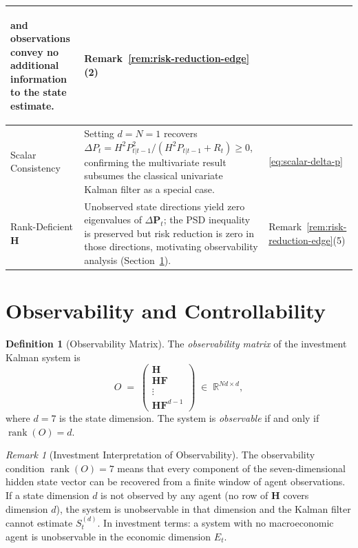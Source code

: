 \documentclass[12pt,openany]{book}
\newcommand{\calE}{\mathcal{E}}
\numberwithin{equation}{chapter}
\theoremstyle{plain}
\theoremstyle{definition}
\newtheorem{definition}[theorem]{Definition}
\theoremstyle{remark}
\newtheorem{remark}[theorem]{Remark}
\DeclareMathOperator{\rank}{rank}
\def\mathcal#1{#1}%
\begin{document}
\begin{center}
\begin{tabularx}{\linewidth}{|>{\bfseries\raggedright\arraybackslash}p{3.2cm}
                              |>{\raggedright\arraybackslash}X
                              |>{\centering\arraybackslash}p{2.8cm}|}
  and observations convey no additional information to the state
  estimate. &
  Remark~\ref{rem:risk-reduction-edge}(2) \\
\hline
Scalar Consistency &
  Setting $d = N = 1$ recovers
  $\Delta P_t = H^2 P_{t|t-1}^2 / (H^2 P_{t|t-1} + R_t) \geq 0$,
  confirming the multivariate result subsumes the classical
  univariate Kalman filter as a special case. &
  \eqref{eq:scalar-delta-p} \\
\hline
Rank-Deficient $\mathbf{H}$ &
  Unobserved state directions yield zero eigenvalues of
  $\Delta\mathbf{P}_t$; the PSD inequality is preserved but
  risk reduction is zero in those directions, motivating
  observability analysis (Section~\ref{def:observability}). &
  Remark~\ref{rem:risk-reduction-edge}(5) \\
\hline
\end{tabularx}
\end{center}

\section{Observability and Controllability}

\begin{definition}[Observability Matrix]
\label{def:observability}
The \emph{observability matrix} of the investment Kalman system is
\begin{equation}
  \mathcal{O} \;=\; \begin{pmatrix}
    \mathbf{H} \\
    \mathbf{H}\mathbf{F} \\
    \vdots \\
    \mathbf{H}\mathbf{F}^{d-1}
  \end{pmatrix} \;\in\; \mathbb{R}^{Nd \times d},
  \label{eq:observability-matrix}
\end{equation}
where $d = 7$ is the state dimension.  The system is
\emph{observable} if and only if $\rank(\mathcal{O}) = d$.
\end{definition}

\begin{remark}[Investment Interpretation of Observability]
\label{rem:observability}
The observability condition $\rank(\mathcal{O}) = 7$ means that every
component of the seven-dimensional hidden state vector can be
recovered from a finite window of agent observations.  If a state
dimension $d$ is not observed by any agent (no row of $\mathbf{H}$
covers dimension $d$), the system is unobservable in that dimension
and the Kalman filter cannot estimate $\mathcal{S}_t^{(d)}$.  In
investment terms: a system with no macroeconomic agent is unobservable
in the economic dimension $\calE_t$.
\end{remark}
\end{document}
